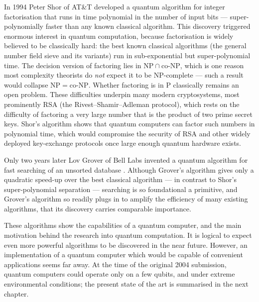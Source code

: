 In 1994 Peter Shor of AT\&T developed a quantum algorithm for integer factorisation \cite{ptafpf94} that runs in time polynomial in the number of input bits --- super-polynomially faster than any known classical algorithm. This discovery triggered enormous interest in quantum computation, because factorisation is widely believed to be classically hard: the best known classical algorithms (the general number field sieve and its variants) run in sub-exponential but super-polynomial time. The decision version of factoring lies in $\mathrm{NP} \cap \mathrm{co\text{-}NP}$, which is one reason most complexity theorists do \emph{not} expect it to be $\mathrm{NP}$-complete --- such a result would collapse $\mathrm{NP} = \mathrm{co\text{-}NP}$. Whether factoring is in $\mathrm{P}$ classically remains an open problem. These difficulties underpin many modern cryptosystems, most prominently RSA (the Rivest--Shamir--Adleman protocol), which rests on the difficulty of factoring a very large number that is the product of two prime secret keys. Shor's algorithm shows that quantum computers can factor such numbers in polynomial time, which would compromise the security of RSA and other widely deployed key-exchange protocols once large enough quantum hardware exists.

Only two years later Lov Grover of Bell Labs invented a quantum algorithm for fast searching of an unsorted database \cite{fqma96}. Although Grover's algorithm gives only a quadratic speed-up over the best classical algorithm --- in contrast to Shor's super-polynomial separation --- searching is so foundational a primitive, and Grover's algorithm so readily plugs in to amplify the efficiency of many existing algorithms, that its discovery carries comparable importance.

These algorithms show the capabilities of a quantum computer, and the main motivation behind the research into quantum computation. It is logical to expect even more powerful algorithms to be discovered in the near future. However, an implementation of a quantum computer which would be capable of convenient applications seems far away. At the time of the original 2004 submission, quantum computers could operate only on a few qubits, and under extreme environmental conditions; the present state of the art is summarised in the next chapter.




